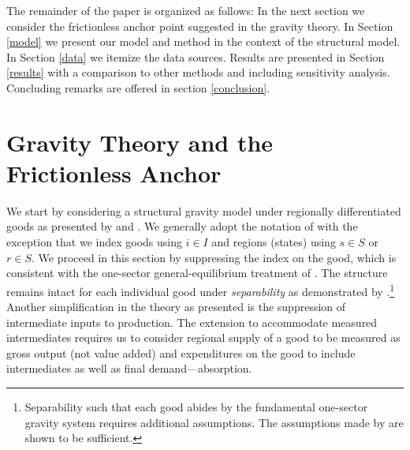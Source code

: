 \documentclass{ejb}
\begin{document}
The remainder of the paper is organized as follows:  In the next
section we consider the frictionless anchor point suggested in the
gravity theory.  In Section \ref{model} we present our model and
method in the context of the 
structural model.  In Section \ref{data} we itemize the data sources.
Results are presented in Section \ref{results} with a comparison to
other methods and including sensitivity analysis.  Concluding remarks
are offered in section \ref{conclusion}.\\

\section{Gravity Theory and the Frictionless Anchor}
\label{gvtyanchor}

We start by considering a structural gravity model under regionally 
differentiated goods as presented by \citet{AvW} and
\citet{Yotov_etal}.  We generally adopt the notation of
\citet{Yotov_etal} with the exception that we index goods using
$i \in I$ and regions (states) using $s \in S$ or $r \in S$. We
proceed in this section by suppressing the index on the good, which is
consistent with the one-sector general-equilibrium treatment of
\citet{AvW}.  The structure remains intact for each individual
good under \emph{separability} as demonstrated by \citet[Appendix
B]{Larch_Yotov_2016}.\footnote{
	Separability such that each good abides by the fundamental
	one-sector \citet{AvW} gravity system requires additional
	assumptions.  The assumptions made by \citet[Appendix
	B]{Larch_Yotov_2016} are shown to be sufficient.}
Another simplification in the \citet{AvW} theory as presented is the
suppression of intermediate inputs to production.  The extension to
accommodate measured intermediates requires us to consider regional
supply of a good to be measured as gross output (not value added) and
expenditures on the good to include intermediates as
well as final demand---absorption.
\end{document}

